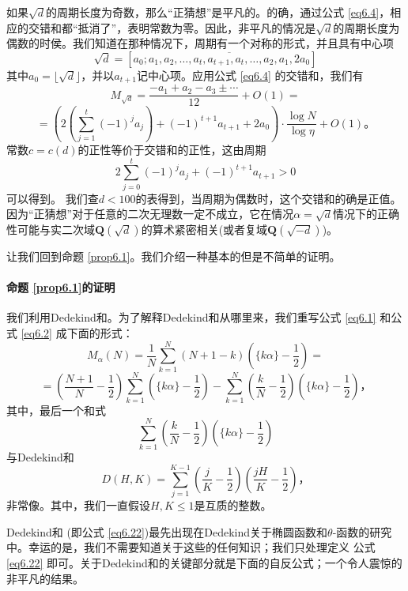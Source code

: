 \documentclass[11pt,a4paper]{article}
\theoremstyle{definition}
\newcommand{\refeq}[1]{公式 \ref{#1}}
\newcommand{\refprop}[1]{命题 \ref{#1}}
\numberwithin{equation}{section}
\newcommand{\comma}{\text{，}}
\newcommand{\juhao}{\text{。}}
\newcommand{\qfield}[1]{$ \mathbf{Q}\left(\sqrt{#1}\right) $}%
\begin{document}
如果$ \sqrt{d} $的周期长度为奇数，那么``正猜想''是平凡的。的确，通过\refeq{eq6.4}，相应的交错和都``抵消了''，表明常数为零。因此，非平凡的情况是$ \sqrt{d} $的周期长度为偶数的时侯。我们知道在那种情况下，周期有一个对称的形式，并且具有中心项
\[ \sqrt{d}=\left[a_{0};\overline{a_{1},a_{2},\ldots,a_{t},a_{t+1},a_{t},\ldots,a_{2},a_{1},2a_{0}}\right] \]
其中$ a_{0}=\lfloor\sqrt{d} \rfloor $，并以$ a_{t+1} $记中心项。应用\refeq{eq6.4} 的交错和，我们有
\[ 	M_{\sqrt{d}}=\dfrac{-a_{1}+a_{2}-a_{3}\pm\cdots}{12}+O\left(1\right)= \]
\[ 	=
	\left( 2 \left(
	\sum_{j=1}^{t}
	{\left(-1\right)}^{j}a_{j}
	\right)+
	{\left(-1\right)}^{t+1}a_{t+1}
	+2a_{0}
	\right) 
	\cdot \dfrac{\log N}{\log\eta}+O\left(1\right)\juhao
 \]
常数$ c=c\left(d\right) $的正性等价于交错和的正性，这由周期
\[ 2\sum_{j=0}^{t}(-1)^{j}a_{j}+(-1)^{t+1}a_{t+1}>0\]
可以得到。
我们查$ d<100 $的表得到，当周期为偶数时，这个交错和的确是正值。因为``正猜想''对于任意的二次无理数一定不成立，它在情况$ \alpha=\sqrt{d} $情况下的正确性可能与实二次域\qfield{d}的算术紧密相关(或者复域\qfield{-d})。

让我们回到\refprop{prop6.1}。我们介绍一种基本的但是不简单的证明。

\paragraph{\refprop{prop6.1}的证明} 我们利用Dedekind和。为了解释Dedekind和从哪里来，我们重写\refeq{eq6.1} 和\refeq{eq6.2} 成下面的形式：
\[ 	M_{\alpha}\left(N\right)=\dfrac{1}{N}\sum_{k=1}^{N}\left(N+1-k\right)\left(\lbrace k\alpha\rbrace-\dfrac{1}{2}\right)= \]
\begin{equation}\label{eq6.21}
=\left(\dfrac{N+1}{N}-\dfrac{1}{2}\right)\sum_{k=1}^{N}\left(\lbrace k\alpha\rbrace-\dfrac{1}{2}\right)-\sum_{k=1}^{N}\left(\dfrac{k}{N}-\dfrac{1}{2}\right)\left(\lbrace k\alpha\rbrace-\dfrac{1}{2}\right)\comma
\end{equation}
其中，最后一个和式
\[ \sum_{k=1}^{N}\left(\dfrac{k}{N}-\dfrac{1}{2}\right)\left(\lbrace k\alpha\rbrace-\dfrac{1}{2}\right) \]
与Dedekind和
\begin{equation}\label{eq6.22}
D\left(H,K\right)=\sum_{j=1}^{K-1}\left(\dfrac{j}{K}-\dfrac{1}{2}\right)\left(\dfrac{jH}{K}-\dfrac{1}{2}\right)\comma
\end{equation}
非常像。其中，我们一直假设$ H, K\leq 1  $是互质的整数。

Dedekind和 (即\refeq{eq6.22})最先出现在Dedekind关于椭圆函数和$ \theta $-函数的研究中。幸运的是，我们不需要知道关于这些的任何知识；我们只处理定义 \refeq{eq6.22} 即可。关于Dedekind和的关键部分就是下面的自反公式；一个令人震惊的非平凡的结果。
\end{document}
